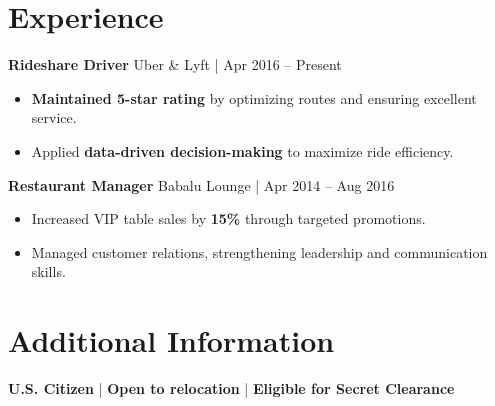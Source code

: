 \documentclass[a4paper,10pt]{article}
\begin{document}
\vspace{-3mm}

\section*{Experience}
\textbf{Rideshare Driver} \hfill Uber \& Lyft | Apr 2016 – Present
\begin{itemize}[leftmargin=0.3in, itemsep=1pt]
    \item \textbf{Maintained 5-star rating} by optimizing routes and ensuring excellent service.
    \item Applied \textbf{data-driven decision-making} to maximize ride efficiency.
\end{itemize}

\textbf{Restaurant Manager} \hfill Babalu Lounge | Apr 2014 – Aug 2016
\begin{itemize}[leftmargin=0.3in, itemsep=1pt]
    \item Increased VIP table sales by \textbf{15\%} through targeted promotions.
    \item Managed customer relations, strengthening leadership and communication skills.
\end{itemize}

\vspace{-3mm}

\section*{Additional Information}
\textbf{U.S. Citizen} \quad | \quad \textbf{Open to relocation} \quad | \quad \textbf{Eligible for Secret Clearance}
\end{document}
